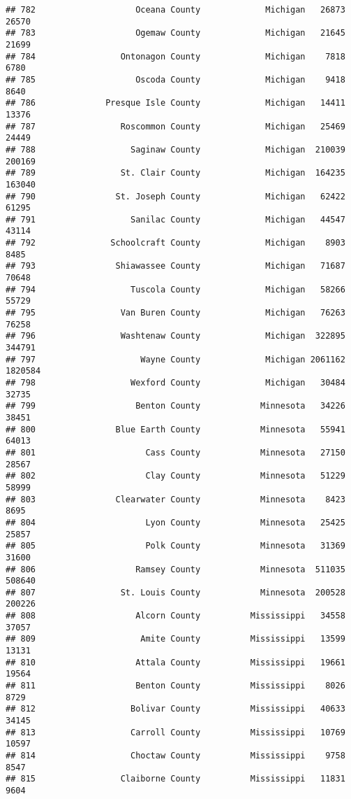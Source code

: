 \documentclass[
]{article}
\begin{document}
\begin{verbatim}
## 782                    Oceana County             Michigan   26873   26570
## 783                    Ogemaw County             Michigan   21645   21699
## 784                 Ontonagon County             Michigan    7818    6780
## 785                    Oscoda County             Michigan    9418    8640
## 786              Presque Isle County             Michigan   14411   13376
## 787                 Roscommon County             Michigan   25469   24449
## 788                   Saginaw County             Michigan  210039  200169
## 789                 St. Clair County             Michigan  164235  163040
## 790                St. Joseph County             Michigan   62422   61295
## 791                   Sanilac County             Michigan   44547   43114
## 792               Schoolcraft County             Michigan    8903    8485
## 793                Shiawassee County             Michigan   71687   70648
## 794                   Tuscola County             Michigan   58266   55729
## 795                 Van Buren County             Michigan   76263   76258
## 796                 Washtenaw County             Michigan  322895  344791
## 797                     Wayne County             Michigan 2061162 1820584
## 798                   Wexford County             Michigan   30484   32735
## 799                    Benton County            Minnesota   34226   38451
## 800                Blue Earth County            Minnesota   55941   64013
## 801                      Cass County            Minnesota   27150   28567
## 802                      Clay County            Minnesota   51229   58999
## 803                Clearwater County            Minnesota    8423    8695
## 804                      Lyon County            Minnesota   25425   25857
## 805                      Polk County            Minnesota   31369   31600
## 806                    Ramsey County            Minnesota  511035  508640
## 807                 St. Louis County            Minnesota  200528  200226
## 808                    Alcorn County          Mississippi   34558   37057
## 809                     Amite County          Mississippi   13599   13131
## 810                    Attala County          Mississippi   19661   19564
## 811                    Benton County          Mississippi    8026    8729
## 812                   Bolivar County          Mississippi   40633   34145
## 813                   Carroll County          Mississippi   10769   10597
## 814                   Choctaw County          Mississippi    9758    8547
## 815                 Claiborne County          Mississippi   11831    9604

\end{verbatim}
\end{document}
